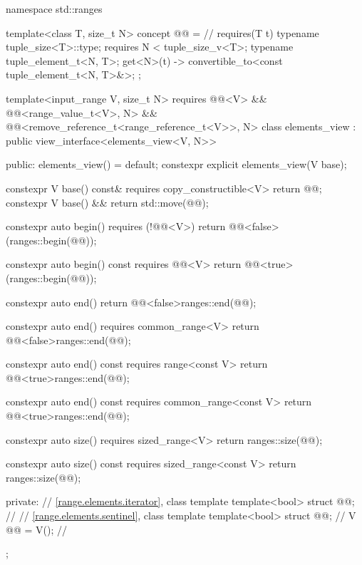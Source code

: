 %
%
%
%
%
\begin{codeblock}
namespace std::ranges {
  template<class T, size_t N>
  concept @@ =                   // \expos
    requires(T t) {
      typename tuple_size<T>::type;
      requires N < tuple_size_v<T>;
      typename tuple_element_t<N, T>;
      { get<N>(t) } -> convertible_to<const tuple_element_t<N, T>&>;
    };


  template<input_range V, size_t N>
    requires @@<V> && @@<range_value_t<V>, N> &&
             @@<remove_reference_t<range_reference_t<V>>, N>
  class elements_view : public view_interface<elements_view<V, N>> {
  public:
    elements_view() = default;
    constexpr explicit elements_view(V base);

    constexpr V base() const& requires copy_constructible<V> { return @@; }
    constexpr V base() && { return std::move(@@); }

    constexpr auto begin() requires (!@@<V>)
    { return @@<false>(ranges::begin(@@)); }

    constexpr auto begin() const requires @@<V>
    { return @@<true>(ranges::begin(@@)); }

    constexpr auto end()
    { return @@<false>{ranges::end(@@)}; }

    constexpr auto end() requires common_range<V>
    { return @@<false>{ranges::end(@@)}; }

    constexpr auto end() const requires range<const V>
    { return @@<true>{ranges::end(@@)}; }

    constexpr auto end() const requires common_range<const V>
    { return @@<true>{ranges::end(@@)}; }

    constexpr auto size() requires sized_range<V>
    { return ranges::size(@@); }

    constexpr auto size() const requires sized_range<const V>
    { return ranges::size(@@); }

  private:
    // \ref{range.elements.iterator}, class template 
    template<bool> struct @@;                     // \expos
    // \ref{range.elements.sentinel}, class template 
    template<bool> struct @@;                     // \expos
    V @@ = V();                                      // \expos
  };
}
\end{codeblock}


